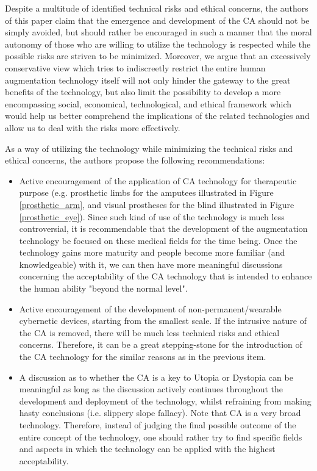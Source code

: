 Despite a multitude of identified technical risks and ethical concerns, the authors of this paper claim that the emergence and development of the CA should not be simply avoided, but should rather be encouraged in such a manner that the moral autonomy of those who are willing to utilize the technology is respected while the possible risks are striven to be minimized. Moreover, we argue that an excessively conservative view which tries to indiscreetly restrict the entire human augmentation technology itself will not only hinder the gateway to the great benefits of the technology, but also limit the possibility to develop a more encompassing social, economical, technological, and ethical framework which would help us better comprehend the implications of the related technologies and allow us to deal with the risks more effectively.

As a way of utilizing the technology while minimizing the technical risks and ethical concerns, the authors propose the following recommendations:
\begin{itemize}
	\item Active encouragement of the application of CA technology for therapeutic purpose (e.g. prosthetic limbs for the amputees illustrated in Figure \ref{prosthetic_arm}, and visual prostheses for the blind illustrated in Figure \ref{prosthetic_eye}). Since such kind of use of the technology is much less controversial, it is recommendable that the development of the augmentation technology be focused on these medical fields for the time being. Once the technology gains more maturity and people become more familiar (and knowledgeable) with it, we can then have more meaningful discussions concerning the acceptability of the CA technology that is intended to enhance the human ability "beyond the normal level".
	\item Active encouragement of the development of non-permanent/wearable cybernetic devices, starting from the smallest scale. If the intrusive nature of the CA is removed, there will be much less technical risks and ethical concerns. Therefore, it can be a great stepping-stone for the introduction of the CA technology for the similar reasons as in the previous item. 
	\item A discussion as to whether the CA is a key to Utopia or Dystopia can be meaningful as long as the discussion actively continues throughout the development and deployment of the technology, whilst refraining from making hasty conclusions (i.e. slippery slope fallacy). Note that CA is a very broad technology. Therefore, instead of judging the final possible outcome of the entire concept of the technology, one should rather try to find specific fields and aspects in which the technology can be applied with the highest acceptability. 
\end{itemize}

